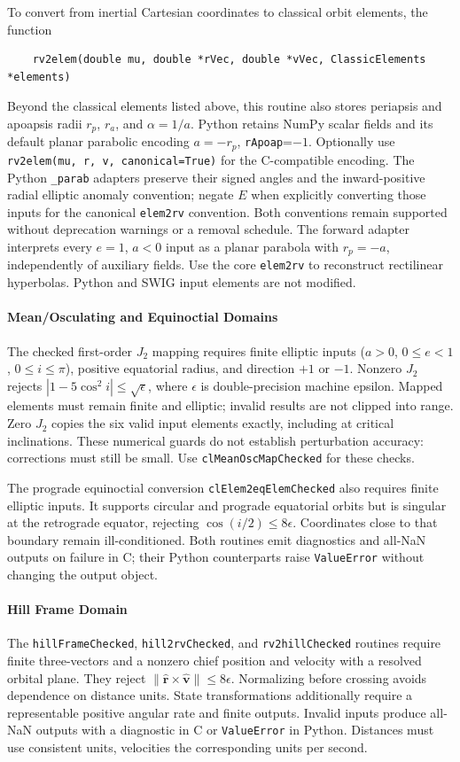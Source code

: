To convert from  inertial Cartesian coordinates to classical orbit elements, the function
\begin{verbatim}
	rv2elem(double mu, double *rVec, double *vVec, ClassicElements *elements)
\end{verbatim}
Beyond the classical elements listed above, this routine also stores periapsis
and apoapsis radii $r_p$, $r_a$, and $\alpha=1/a$.
Python retains NumPy scalar fields and its default planar parabolic encoding
$a=-r_p$, {\tt rApoap}=$-1$.
Optionally use {\tt rv2elem(mu, r, v, canonical=True)} for the C-compatible encoding.
The Python {\tt *\_parab} adapters preserve their signed angles and the
inward-positive radial elliptic anomaly convention; negate $E$ when explicitly
converting those inputs for the canonical {\tt elem2rv} convention. Both
conventions remain supported without deprecation warnings or a removal schedule.
The forward adapter interprets every $e=1$, $a<0$ input as a planar parabola
with $r_p=-a$, independently of auxiliary fields. Use the core {\tt elem2rv}
to reconstruct rectilinear hyperbolas. Python and SWIG input elements are not modified.


\paragraph{Mean/Osculating and Equinoctial Domains}
The checked first-order $J_2$ mapping requires finite elliptic inputs
($a>0$, $0\le e<1$, $0\le i\le\pi$), positive equatorial radius, and direction
$+1$ or $-1$. Nonzero $J_2$ rejects
$|1-5\cos^2 i|\le\sqrt{\epsilon}$, where $\epsilon$ is double-precision machine
epsilon. Mapped elements must remain finite and elliptic; invalid results are
not clipped into range. Zero $J_2$ copies the six valid input elements exactly,
including at critical inclinations. These numerical guards do not establish
perturbation accuracy: corrections must still be small. Use
{\tt clMeanOscMapChecked} for these checks.

The prograde equinoctial conversion {\tt clElem2eqElemChecked} also requires finite
elliptic inputs. It supports circular and prograde equatorial orbits but is
singular at the retrograde equator, rejecting $\cos(i/2)\le8\epsilon$.
Coordinates close to that boundary remain ill-conditioned.
Both routines emit diagnostics and all-NaN outputs on failure in C; their
Python counterparts raise {\tt ValueError} without changing the output object.

\paragraph{Hill Frame Domain}
The {\tt hillFrameChecked}, {\tt hill2rvChecked}, and
{\tt rv2hillChecked} routines require finite
three-vectors and a nonzero chief position and velocity with a resolved orbital
plane. They reject
$\|\hat{\bm r}\mathbin{\times}\hat{\bm v}\|\le8\epsilon$.
Normalizing before crossing avoids dependence on distance units. State
transformations additionally require a representable positive angular rate and
finite outputs. Invalid inputs produce all-NaN outputs with a diagnostic in C
or {\tt ValueError} in Python. Distances must use consistent units, velocities
the corresponding units per second.

